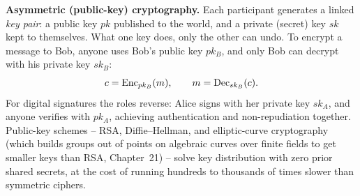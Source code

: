 \textbf{Asymmetric (public-key) cryptography.} Each participant generates a linked \emph{key pair}: a public key $pk$ published to the world, and a private (secret) key $sk$ kept to themselves. What one key does, only the other can undo. To encrypt a message to Bob, anyone uses Bob's public key $pk_B$, and only Bob can decrypt with his private key $sk_B$:
\[
c = \operatorname{Enc}_{pk_B}(m), \qquad m = \operatorname{Dec}_{sk_B}(c).
\]
For digital signatures the roles reverse: Alice signs with her private key $sk_A$, and anyone verifies with $pk_A$, achieving authentication and non-repudiation together. Public-key schemes -- RSA, Diffie--Hellman, and elliptic-curve cryptography (which builds groups out of points on algebraic curves over finite fields to get smaller keys than RSA, Chapter~21) -- solve key distribution with zero prior shared secrets, at the cost of running hundreds to thousands of times slower than symmetric ciphers.

